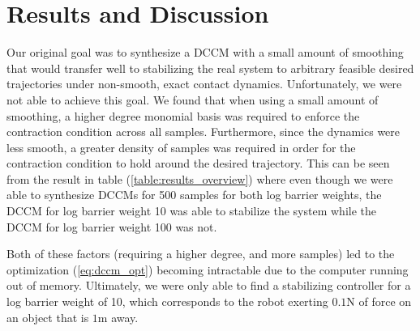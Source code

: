\documentclass[journal]{IEEEtran}
\begin{document}
\section{Results and Discussion}
Our original goal was to synthesize a DCCM with a small amount of smoothing that would transfer well to stabilizing the real system to arbitrary feasible desired trajectories under non-smooth, exact contact dynamics. Unfortunately, we were not able to achieve this goal. We found that when using a small amount of smoothing, a higher degree monomial basis was required to enforce the contraction condition across all samples. Furthermore, since the dynamics were less smooth, a greater density of samples was required in order for the contraction condition to hold around the desired trajectory. This can be seen from the result in table (\ref{table:results_overview}) where even though we were able to synthesize DCCMs for 500 samples for both log barrier weights, the DCCM for log barrier weight 10 was able to stabilize the system while the DCCM for log barrier weight 100 was not.

Both of these factors (requiring a higher degree, and more samples) led to the optimization (\ref{eq:dccm_opt}) becoming intractable due to the computer running out of memory. Ultimately, we were only able to find a stabilizing controller for a log barrier weight of 10, which corresponds to the robot exerting $0.1$N of force on an object that is $1$m away.
\end{document}
